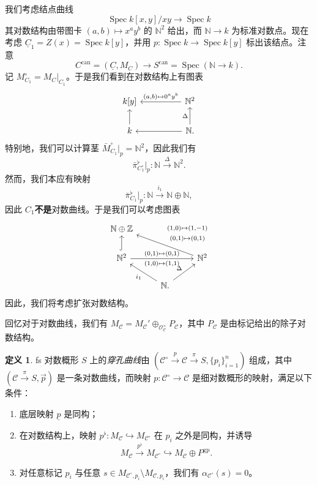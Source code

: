 \documentclass{amsart}
\theoremstyle{definition}
\newtheorem{defn}[thm]{定义}
\theoremstyle{remark}
\theoremstyle{plain}
\theoremstyle{definition}
\theoremstyle{remark}
\newcommand{\N}{\mathbb{N}}
\newcommand{\Z}{\mathbb{Z}}
\newcommand{\mc}[1]{\mathcal{#1}}
\newcommand{\mr}[1]{\mathrm{#1}}
\newcommand{\on}[1]{\operatorname{#1}}
\newcommand{\ul}[1]{\underline{#1}}
\newcommand{\1}{\mathbf{1}}
\newcommand{\2}{\mathbf{2}}
\newcommand{\3}{\mathbf{3}}
\DeclareMathOperator{\Spec}{Spec}
\begin{document}
我们考虑结点曲线
\[ \Spec k[x,y]/xy \to \Spec k \]
其对数结构由带图卡 \((a,b) \mapsto x^a y^b\) 的 \(\N^2\) 给出，而 \(\N \to k\) 为标准对数点。现在考虑 \(\ul{C}_1 = Z(x) = \Spec k[y]\)，并用 \(p \colon \Spec k \to \Spec k[y]\) 标出该结点。注意
\[ C^{\on{can}} = (\ul{C}, M_C) \to S^{\on{can}} = \Spec(\N \to k). \]
记 \(M_{C_1}^{\circ} = M_C|_{C_1}\)。于是我们看到在对数结构上有图表
\begin{equation*}
\begin{tikzcd}
    k[y] & & \N^2 \ar{ll}[swap]{(a,b) \mapsto 0^a y^b} \\
    k \ar{u} & & \N \ar{ll} \ar{u}{\Delta}.
\end{tikzcd}
\end{equation*}
特别地，我们可以计算茎 \(\bar{M}_{C_1}^{\circ}|_p = \N^2\)，因此我们有
\[ \bar{\pi}_{C_1^{\circ}}^{\flat} |_p \colon \N \xrightarrow{\Delta} \N^2. \]
然而，我们本应有映射
\[ \bar{\pi}^{\flat}_{C_1}|_p \colon \N \xrightarrow{i_1} \N \oplus \N, \]
因此 \(C_1\)\textbf{不是}对数曲线。于是我们可以考虑图表
\begin{equation*}
\begin{tikzcd}
    \N \oplus \Z \\
    \N^2 \ar[hookrightarrow]{u} \ar{rr}{(0,1)\mapsto (0,1)}[swap]{(1,0)\mapsto (1,1)} & & \N^2 \ar{ull}[swap]{\Vectorstack{{(1,0)\mapsto(1,-1)} {(0,1)\mapsto(0,1)}}} \\
    & \N \ar{ul}{i_1} \ar{ur}{\Delta}.
\end{tikzcd}
\end{equation*}
因此，我们将考虑扩张对数结构。

回忆对于对数曲线，我们有 \(M_{\mc{C}} = M_{\mc{C}}' \oplus_{\mc{O}_{\mc{C}}^{\times}} P_{\mc{C}}\)，其中 \(P_{\mc{C}}\) 是由标记给出的除子对数结构。

\begin{defn}
    fs 对数概形 \(S\) 上的\textit{穿孔曲线}由 \((\mc{C}^{\circ} \xrightarrow{p} \mc{C} \xrightarrow{\pi} S, \{p_i\}_{i=1}^n)\) 组成，其中 \((\mc{C} \xrightarrow{\pi} S, \vec{p})\) 是一条对数曲线，而映射 \(p \colon \mc{C}^{\circ} \to \mc{C}\) 是细对数概形的映射，满足以下条件：
    \begin{enumerate}
        \item 底层映射 \(\ul{p}\) 是同构；
        \item 在对数结构上，映射 \(p^{\flat} \colon M_{\mc{C}} \hookrightarrow M_{\mc{C}^{\circ}}\) 在 \(p_i\) 之外是同构，并诱导
            \[ M_{\mc{C}} \xrightarrow{p^{\flat}} M_{\mc{C}^{\circ}} \hookrightarrow M_{\mc{C}} \oplus P^{\mr{gp}}. \]
        \item 对任意标记 \(p_i\) 与任意 \(s \in M_{\mc{C}^{\circ}, p_i} \setminus M_{\mc{C}, p_i}\)，我们有 \(\alpha_{\mc{C}^{\circ}}(s) = 0\)。
    \end{enumerate}
\end{defn}
\end{document}
